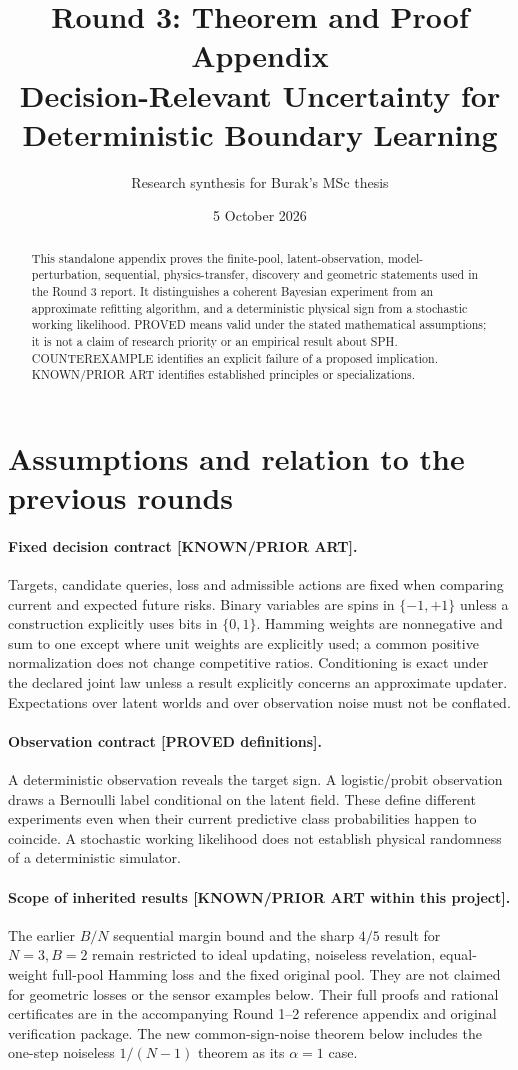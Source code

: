 \documentclass[11pt]{article}
\title{Round 3: Theorem and Proof Appendix\\
Decision-Relevant Uncertainty for Deterministic Boundary Learning}
\author{Research synthesis for Burak's MSc thesis}
\date{5 October 2026}
\theoremstyle{definition}
\theoremstyle{remark}
\begin{document}
\maketitle
\begin{abstract}
This standalone appendix proves the finite-pool, latent-observation,
model-perturbation, sequential, physics-transfer, discovery and geometric
statements used in the Round 3 report. It distinguishes a coherent
Bayesian experiment from an approximate refitting algorithm, and a
deterministic physical sign from a stochastic working likelihood.
PROVED means valid under the stated mathematical assumptions; it is not
a claim of research priority or an empirical result about SPH.
COUNTEREXAMPLE identifies an explicit failure of a proposed implication.
KNOWN/PRIOR ART identifies established principles or specializations.
\end{abstract}
\tableofcontents
\clearpage
\section*{Assumptions and relation to the previous rounds}
\paragraph{Fixed decision contract [KNOWN/PRIOR ART].}
Targets, candidate queries, loss and admissible actions are fixed when
comparing current and expected future risks. Binary variables are spins
in $\{-1,+1\}$ unless a construction explicitly uses bits in $\{0,1\}$.
Hamming weights are nonnegative and sum to one except where unit weights
are explicitly used; a common positive normalization does not change
competitive ratios. Conditioning is exact under the declared joint law
unless a result explicitly concerns an approximate updater. Expectations
over latent worlds and over observation noise must not be conflated.
\paragraph{Observation contract [PROVED definitions].}
A deterministic observation reveals the target sign. A logistic/probit
observation draws a Bernoulli label conditional on the latent field.
These define different experiments even when their current predictive
class probabilities happen to coincide. A stochastic working likelihood
does not establish physical randomness of a deterministic simulator.
\paragraph{Scope of inherited results [KNOWN/PRIOR ART within this project].}
The earlier $B/N$ sequential margin bound and the sharp $4/5$ result for
$N=3,B=2$ remain restricted to ideal updating, noiseless revelation,
equal-weight full-pool Hamming loss and the fixed original pool.
They are not claimed for geometric losses or the sensor examples below.
Their full proofs and rational certificates are in the accompanying
Round 1--2 reference appendix and original verification package.
The new common-sign-noise theorem below includes the one-step noiseless
$1/(N-1)$ theorem as its $\alpha=1$ case.
\end{document}
